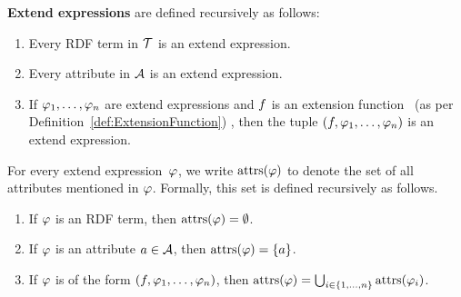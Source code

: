 % 


\begin{definition}
	\label{def:ExtendExpressions:Syntax}
	\normalfont
		\textbf{Extend expressions} are defined recursively as follows:%
%
\vspace{-2mm} %
%
	\begin{enumerate}
		\item
		Every RDF term in $\mathcal{T}$ is an extend expression.

		\item
		Every attribute in $\mathcal{A}$ is an extend expression.

		\item
		If $\varphi_1,\dots,\varphi_n$ are extend expressions and $f$ is an extension function%
			~(as per Definition~\ref{def:ExtensionFunction})%
		, then the tuple $(f,\varphi_1,\dots,\varphi_n)$ is an extend expression.
	\end{enumerate}
\end{definition}

For every extend expression~$\varphi$, we write $\mathrm{attrs}(\varphi)$ to denote the set of all attributes mentioned in $\varphi$. Formally, this set is defined recursively as follows.%
%
\vspace{-2mm} %
%
\begin{enumerate}
	\item If $\varphi$ is an RDF term, then $\mathrm{attrs}(\varphi) = \emptyset$.
	\item If $\varphi$ is an attribute $a \in \mathcal{A}$, then $\mathrm{attrs}(\varphi) = \{a\}$.
	\item If $\varphi$ is of the form $(f,\varphi_1,\dots,\varphi_n)$, then $\mathrm{attrs}(\varphi) = \bigcup_{i \in \{1,\ldots,n\}} \mathrm{attrs}(\varphi_i)$.
\end{enumerate}

